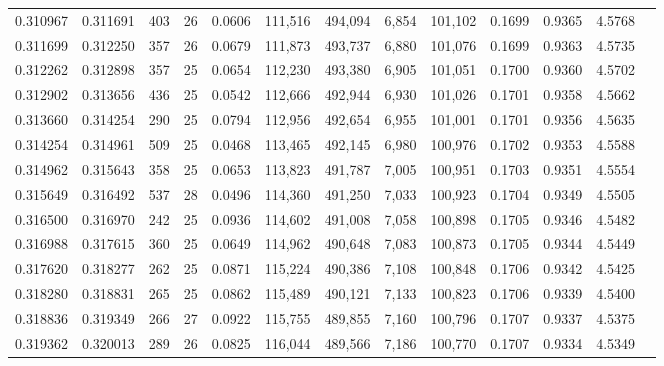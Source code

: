 \begin{tabular}{rrrrrrrrrrrrr}
0.310967 & 0.311691 & 403 &  26 &                                     0.0606 & 111,516 & 494,094 &   6,854 & 101,102 & 0.1699 & 0.9365 & 4.5768 \\
0.311699 & 0.312250 & 357 &  26 &                                     0.0679 & 111,873 & 493,737 &   6,880 & 101,076 & 0.1699 & 0.9363 & 4.5735 \\
0.312262 & 0.312898 & 357 &  25 &                                     0.0654 & 112,230 & 493,380 &   6,905 & 101,051 & 0.1700 & 0.9360 & 4.5702 \\
0.312902 & 0.313656 & 436 &  25 &                                     0.0542 & 112,666 & 492,944 &   6,930 & 101,026 & 0.1701 & 0.9358 & 4.5662 \\
0.313660 & 0.314254 & 290 &  25 &                                     0.0794 & 112,956 & 492,654 &   6,955 & 101,001 & 0.1701 & 0.9356 & 4.5635 \\
0.314254 & 0.314961 & 509 &  25 &                                     0.0468 & 113,465 & 492,145 &   6,980 & 100,976 & 0.1702 & 0.9353 & 4.5588 \\
0.314962 & 0.315643 & 358 &  25 &                                     0.0653 & 113,823 & 491,787 &   7,005 & 100,951 & 0.1703 & 0.9351 & 4.5554 \\
0.315649 & 0.316492 & 537 &  28 &                                     0.0496 & 114,360 & 491,250 &   7,033 & 100,923 & 0.1704 & 0.9349 & 4.5505 \\
0.316500 & 0.316970 & 242 &  25 &                                     0.0936 & 114,602 & 491,008 &   7,058 & 100,898 & 0.1705 & 0.9346 & 4.5482 \\
0.316988 & 0.317615 & 360 &  25 &                                     0.0649 & 114,962 & 490,648 &   7,083 & 100,873 & 0.1705 & 0.9344 & 4.5449 \\
0.317620 & 0.318277 & 262 &  25 &                                     0.0871 & 115,224 & 490,386 &   7,108 & 100,848 & 0.1706 & 0.9342 & 4.5425 \\
0.318280 & 0.318831 & 265 &  25 &                                     0.0862 & 115,489 & 490,121 &   7,133 & 100,823 & 0.1706 & 0.9339 & 4.5400 \\
0.318836 & 0.319349 & 266 &  27 &                                     0.0922 & 115,755 & 489,855 &   7,160 & 100,796 & 0.1707 & 0.9337 & 4.5375 \\
0.319362 & 0.320013 & 289 &  26 &                                     0.0825 & 116,044 & 489,566 &   7,186 & 100,770 & 0.1707 & 0.9334 & 4.5349 \\

\end{tabular}
